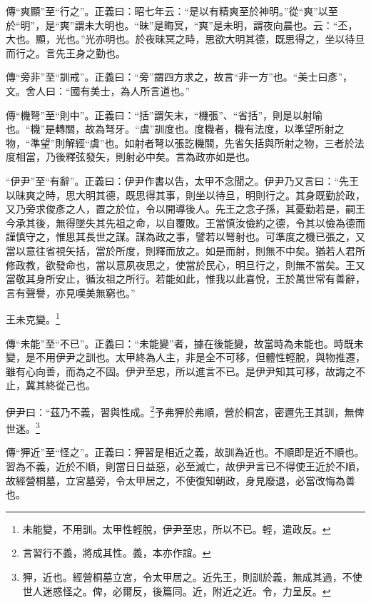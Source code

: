 {\noindent\zhuan{}\fzbyks 傳“爽顯”至“行之”。正義曰：昭七年云：“是以有精爽至於神明。”從“爽”以至於“明”，是“爽”謂未大明也。“昧”是晦冥，“爽”是未明，謂夜向晨也。云：“丕，大也。顯，光也。”光亦明也。於夜昧冥之時，思欲大明其德，既思得之，坐以待旦而行之。言先王身之勤也。 \par}

{\noindent\zhuan{}\fzbyks 傳“旁非”至“訓戒”。正義曰：“旁”謂四方求之，故言“非一方”也。“美士曰彥”，文。舍人曰：“國有美士，為人所言道也。” \par}

{\noindent\zhuan{}\fzbyks 傳“機弩”至“則中”。正義曰：“括”謂矢末，“機張”、“省括”，則是以射喻也。“機”是轉關，故為弩牙。“虞”訓度也。度機者，機有法度，以準望所射之物，“準望”則解經“虞”也。如射者弩以張訖機關，先省矢括與所射之物，三者於法度相當，乃後釋弦發矢，則射必中矣。言為政亦如是也。 \par}

{\noindent\shu{}\fzkt “伊尹”至“有辭”。正義曰：伊尹作書以告，太甲不念聞之。伊尹乃又言曰：“先王以昧爽之時，思大明其德，既思得其事，則坐以待旦，明則行之。其身既勤於政，又乃旁求俊彥之人，置之於位，令以開導後人。先王之念子孫，其憂勤若是，嗣王今承其後，無得墜失其先祖之命，以自覆敗。王當慎汝儉約之德，令其以儉為德而謹慎守之，惟思其長世之謀。謀為政之事，譬若以弩射也。可準度之機已張之，又當以意往省視矢括，當於所度，則釋而放之。如是而射，則無不中矣。猶若人君所修政教，欲發命也，當以意夙夜思之，使當於民心，明旦行之，則無不當矣。王又當敬其身所安止，循汝祖之所行。若能如此，惟我以此喜悅，王於萬世常有善辭，言有聲譽，亦見嘆美無窮也。” \par}

王未克變。\footnote{未能變，不用訓。太甲性輕脫，伊尹至忠，所以不已。輕，遣政反。}

{\noindent\zhuan{}\fzbyks 傳“未能”至“不已”。正義曰：“未能變”者，據在後能變，故當時為未能也。時既未變，是不用伊尹之訓也。太甲終為人主，非是全不可移，但體性輕脫，與物推遷，雖有心向善，而為之不固。伊尹至忠，所以進言不已。是伊尹知其可移，故誨之不止，冀其終從己也。 \par}

伊尹曰：“茲乃不義，習與性成。\footnote{言習行不義，將成其性。義，本亦作誼。}予弗狎於弗順，營於桐宮，密邇先王其訓，無俾世迷。\footnote{狎，近也。經營桐墓立宮，令太甲居之。近先王，則訓於義，無成其過，不使世人迷惑怪之。俾，必爾反，後篇同。近，附近之近。令，力呈反。}


{\noindent\zhuan{}\fzbyks 傳“狎近”至“怪之”。正義曰：狎習是相近之義，故訓為近也。不順即是近不順也。習為不義，近於不順，則當日日益惡，必至滅亡，故伊尹言已不得使王近於不順，故經營桐墓，立宮墓旁，令太甲居之，不使復知朝政，身見廢退，必當改悔為善也。 \par}

